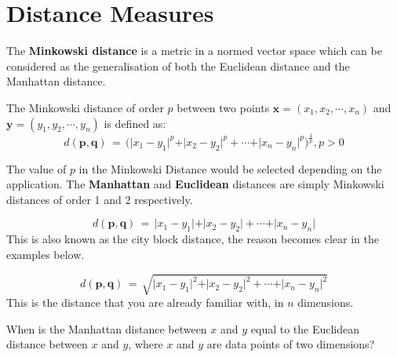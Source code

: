 \documentclass[11pt,fleqn]{book} %
\begin{document}
\section{Distance Measures}
The \textbf{Minkowski distance} is a metric in a normed vector space which can be considered as the generalisation of both the Euclidean distance and the Manhattan distance. \\

\begin{definition}
The Minkowski distance of order $p$ between two points $\mathbf{x} = (x_1, x_2, \cdots, x_n)$ and $\mathbf{y} = (y_1, y_2, \cdots, y_n)$ is defined as:
\begin{equation*}
	d(\mathbf{p},\mathbf{q}) \, = \, \Bigg(\vert x_1 - y_1 \vert^p + \vert x_2 - y_2 \vert^p + \cdots + \vert x_n - y_n \vert^p \Bigg)^{\frac{1}{p}}, p > 0
\end{equation*}
\end{definition}

\noindent
The value of $p$ in the Minkowski Distance would be selected depending on the application. The \textbf{Manhattan} and \textbf{Euclidean} distances are simply Minkowski distances of order 1 and 2 respectively.\\

\begin{definition}
\begin{equation*}
	d(\mathbf{p},\mathbf{q}) \, = \, \vert x_1 - y_1 \vert + \vert x_2 - y_2 \vert + \cdots + \vert x_n - y_n \vert
\end{equation*}
This is also known as the city block distance, the reason becomes clear in the examples below.
\end{definition}

\begin{definition}
\begin{equation*}
	d(\mathbf{p},\mathbf{q}) \, = \, \sqrt{\vert x_1 - y_1 \vert^2 + \vert x_2 - y_2 \vert^2 + \cdots + \vert x_n - y_n \vert^2}
\end{equation*}
This is the distance that you are already familiar with, in $n$ dimensions.
\end{definition}

\begin{exercise}
When is the Manhattan distance between $x$ and $y$ equal to the Euclidean distance between $x$ and $y$, where $x$ and $y$ are data points of two dimensions?
\end{exercise}
\end{document}
